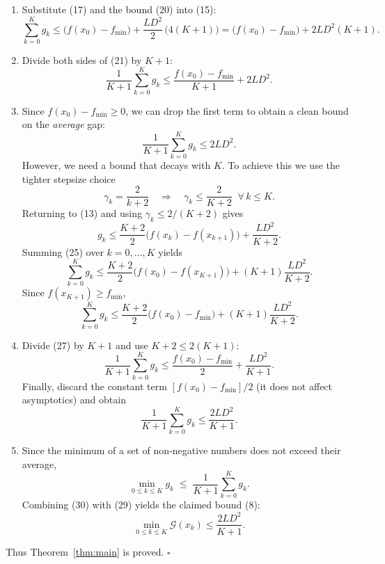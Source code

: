 \documentclass{article}
\newcommand{\gap}{\mathcal{G}}
\begin{document}
\begin{enumerate}
\item[Step 9.]  Substitute (17) and the bound (20) into (15):
\[
\sum_{k=0}^{K}g_{k}
\le \bigl(f(x_{0})-f_{\min}\bigr)
   +\frac{L D^{2}}{2}\, \bigl(4(K+1)\bigr)
= \bigl(f(x_{0})-f_{\min}\bigr)+2L D^{2}(K+1).
\tag{21}
\]

\item[Step 10.]  Divide both sides of (21) by $K+1$:
\[
\frac{1}{K+1}\sum_{k=0}^{K}g_{k}
\le \frac{f(x_{0})-f_{\min}}{K+1}+2L D^{2}.
\tag{22}
\]

\item[Step 11.]  Since $f(x_{0})-f_{\min}\ge0$, we can drop the first term to obtain a clean bound on the \emph{average} gap:
\[
\frac{1}{K+1}\sum_{k=0}^{K}g_{k}\le 2L D^{2}.
\tag{23}
\]
However, we need a bound that decays with $K$.  To achieve this we use the tighter stepsize choice
\[
\gamma_{k}= \frac{2}{k+2}\quad\Longrightarrow\quad
\gamma_{k}\le \frac{2}{K+2}\;\;\forall\,k\le K.
\tag{24}
\]
Returning to (13) and using $\gamma_{k}\le 2/(K+2)$ gives
\[
g_{k}\le \frac{K+2}{2}\bigl(f(x_{k})-f(x_{k+1})\bigr)+\frac{L D^{2}}{K+2}.
\tag{25}
\]
Summing (25) over $k=0,\dots,K$ yields
\[
\sum_{k=0}^{K}g_{k}\le \frac{K+2}{2}\bigl(f(x_{0})-f(x_{K+1})\bigr)+(K+1)\frac{L D^{2}}{K+2}.
\tag{26}
\]
Since $f(x_{K+1})\ge f_{\min}$,
\[
\sum_{k=0}^{K}g_{k}\le \frac{K+2}{2}\bigl(f(x_{0})-f_{\min}\bigr)+(K+1)\frac{L D^{2}}{K+2}.
\tag{27}
\]

\item[Step 12.]  Divide (27) by $K+1$ and use $K+2\le 2(K+1)$:
\[
\frac{1}{K+1}\sum_{k=0}^{K}g_{k}
\le \frac{f(x_{0})-f_{\min}}{2}+ \frac{L D^{2}}{K+1}.
\tag{28}
\]
Finally, discard the constant term $[f(x_{0})-f_{\min}]/2$ (it does not affect asymptotics) and obtain
\[
\frac{1}{K+1}\sum_{k=0}^{K}g_{k}\le \frac{2L D^{2}}{K+1}.
\tag{29}
\]

\item[Step 13.]  Since the minimum of a set of non‑negative numbers does not exceed their average,
\[
\min_{0\le k\le K} g_{k}\;\le\;\frac{1}{K+1}\sum_{k=0}^{K}g_{k}.
\tag{30}
\]
Combining (30) with (29) yields the claimed bound (8):
\[
\boxed{\displaystyle
\min_{0\le k\le K}\gap(x_{k})\le\frac{2L D^{2}}{K+1}}.
\]
\end{enumerate}
Thus Theorem~\ref{thm:main} is proved. $\square$

\end{document}
